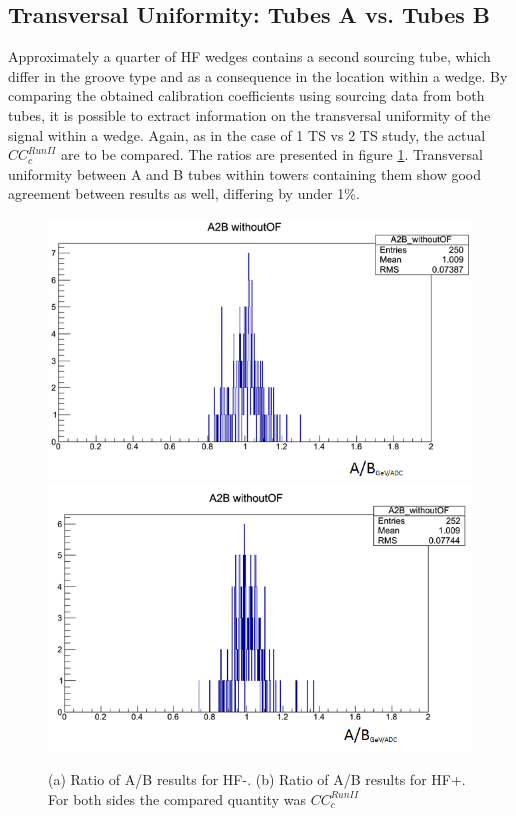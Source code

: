 \subsection{Transversal Uniformity: Tubes A vs. Tubes B}
Approximately a quarter of HF wedges contains a second sourcing tube, which
differ in the groove type and as a consequence in the location within a wedge.
By comparing the obtained calibration coefficients using sourcing data from both
tubes, it is possible to extract information on the transversal uniformity of the signal within a wedge. Again, as in the case of 1 TS vs 2 TS study, the actual ${CC}^{Run II}_{c}$ are to be compared. The ratios are presented in figure \ref{fig:HF_A2B}. Transversal uniformity between A and B tubes within towers containing them show good agreement between results as well, differing by under 1\%.
\begin{figure}[htb]
    \centering
    \includegraphics[width=.45\textwidth]{figures/ch_hfcalibration/HFM_A2B_woOF.png}
    \includegraphics[width=.45\textwidth]{figures/ch_hfcalibration/HFP_A2B_woOF.png}
    \caption{(a) Ratio of A/B results for HF-. (b) Ratio of A/B results for HF+. For both sides the compared quantity was ${CC}^{Run II}_{c}$}
    \label{fig:HF_A2B}
\end{figure}


